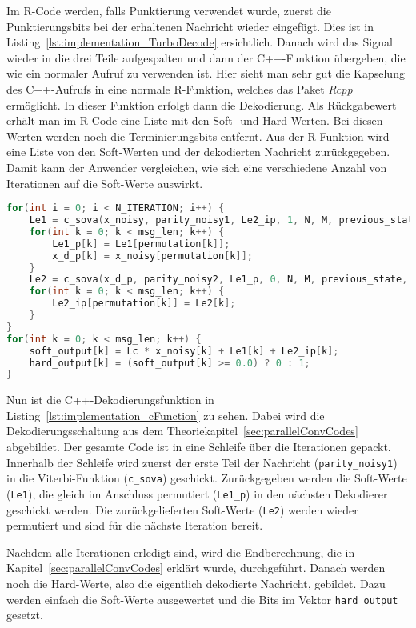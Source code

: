 Im R-Code werden, falls Punktierung verwendet wurde, zuerst die Punktierungsbits bei der erhaltenen Nachricht wieder eingefügt. Dies ist in Listing~\ref{lst:implementation_TurboDecode} ersichtlich. Danach wird das Signal wieder in die drei Teile aufgespalten und dann der C++-Funktion übergeben, die wie ein normaler Aufruf zu verwenden ist. Hier sieht man sehr gut die Kapselung des C++-Aufrufs in eine normale R-Funktion, welches das Paket \emph{Rcpp} ermöglicht. In dieser Funktion erfolgt dann die Dekodierung. Als Rückgabewert erhält man im R-Code eine Liste mit den Soft- und Hard-Werten. Bei diesen Werten werden noch die Terminierungsbits entfernt. Aus der R-Funktion wird eine Liste von den Soft-Werten und der dekodierten Nachricht
zurückgegeben. Damit kann der Anwender vergleichen, wie sich eine verschiedene Anzahl von Iterationen auf die Soft-Werte auswirkt.

\begin{lstlisting}[language=C++,caption=Implementierung der C++-Funktion zur Dekodierung, label={lst:implementation_cFunction}, float=!th]
for(int i = 0; i < N_ITERATION; i++) {
	Le1 = c_sova(x_noisy, parity_noisy1, Le2_ip, 1, N, M, previous_state, output, output_index);
    for(int k = 0; k < msg_len; k++) {
		Le1_p[k] = Le1[permutation[k]];
		x_d_p[k] = x_noisy[permutation[k]];
    }
	Le2 = c_sova(x_d_p, parity_noisy2, Le1_p, 0, N, M, previous_state, output, output_index);
    for(int k = 0; k < msg_len; k++) {
    	Le2_ip[permutation[k]] = Le2[k];
	}
}
for(int k = 0; k < msg_len; k++) {
   	soft_output[k] = Lc * x_noisy[k] + Le1[k] + Le2_ip[k];
   	hard_output[k] = (soft_output[k] >= 0.0) ? 0 : 1;
}
\end{lstlisting}

Nun ist die C++-Dekodierungsfunktion in Listing~\ref{lst:implementation_cFunction} zu sehen. Dabei wird die Dekodierungsschaltung aus dem Theoriekapitel~\ref{sec:parallelConvCodes} abgebildet. Der gesamte Code ist in eine Schleife über die Iterationen gepackt. Innerhalb der Schleife wird zuerst der erste Teil der Nachricht (\texttt{parity\_noisy1}) in die Viterbi-Funktion (\texttt{c\_sova}) geschickt. Zurückgegeben werden die Soft-Werte (\texttt{Le1}), die gleich im Anschluss permutiert (\texttt{Le1\_p}) in den nächsten Dekodierer geschickt werden. Die zurückgelieferten Soft-Werte (\texttt{Le2}) werden wieder permutiert und sind für die nächste Iteration bereit.

Nachdem alle Iterationen erledigt sind, wird die Endberechnung, die in Kapitel~\ref{sec:parallelConvCodes} erklärt wurde, durchgeführt. Danach werden noch die Hard-Werte, also die eigentlich dekodierte Nachricht, gebildet. Dazu werden einfach die Soft-Werte ausgewertet und die Bits im Vektor \texttt{hard\_output} gesetzt.

